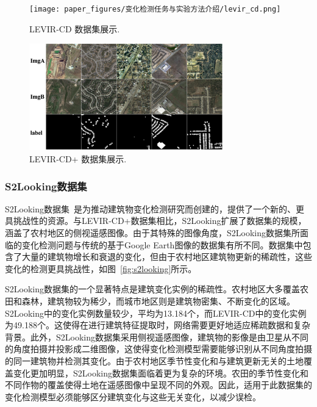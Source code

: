 \begin{figure}[!htbp]
  \centering
  \texttt{[image: paper\_figures/变化检测任务与实验方法介绍/levir\_cd.png]}
  \caption{LEVIR-CD 数据集展示.}
  \label{fig:levir_cd}
\end{figure}

\begin{figure}[!htbp]
  \centering
  \includegraphics[width=0.75\textwidth]{paper_figures/变化检测任务与实验方法介绍/levir_cd_plus.png}
  \caption{LEVIR-CD+ 数据集展示.}
  \label{fig:levir_cd_plus}
\end{figure}

\subsubsection{S2Looking数据集}
S2Looking数据集~\cite{Shen2021S2LookingAS}是为推动建筑物变化检测研究而创建的，提供了一个新的、更具挑战性的资源。与LEVIR-CD+数据集相比，S2Looking扩展了数据集的规模，涵盖了农村地区的侧视遥感图像。由于其特殊的图像角度，S2Looking数据集所面临的变化检测问题与传统的基于Google Earth图像的数据集有所不同。数据集中包含了大量的建筑物增长和衰退的变化，但由于农村地区建筑物更新的稀疏性，这些变化的检测更具挑战性，如图~\ref{fig:s2looking}所示。

S2Looking数据集的一个显著特点是建筑变化实例的稀疏性。农村地区大多覆盖农田和森林，建筑物较为稀少，而城市地区则是建筑物密集、不断变化的区域。S2Looking中的变化实例数量较少，平均为13.184个，而LEVIR-CD中的变化实例为49.188个。这使得在进行建筑特征提取时，网络需要更好地适应稀疏数据和复杂背景。此外，S2Looking数据集采用侧视遥感图像，建筑物的影像是由卫星从不同的角度拍摄并投影成二维图像，这使得变化检测模型需要能够识别从不同角度拍摄的同一建筑物并检测其变化。由于农村地区季节性变化和与建筑更新无关的土地覆盖变化更加明显，S2Looking数据集面临着更为复杂的环境。农田的季节性变化和不同作物的覆盖使得土地在遥感图像中呈现不同的外观。因此，适用于此数据集的变化检测模型必须能够区分建筑变化与这些无关变化，以减少误检。

